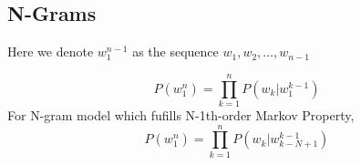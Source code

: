 \documentclass{article}
\numberwithin{equation}{section}
\numberwithin{figure}{section}
\begin{document}
\subsection{N-Grams}
Here we denote $w_1^{n-1}$ as the sequence $w_1, w_2, \dots, w_{n-1}$
\par
\begin{equation*}
        P(w_1^n) = \prod_{k=1}^n P(w_k | w_1^{k-1})
\end{equation*}
For N-gram model which fufills N-1th-order Markov Property, 
\begin{equation*}
        P(w_1^n) = \prod_{k=1}^n P(w_k | w_{k-N+1}^{k-1})
\end{equation*}

%
%
\end{document}
